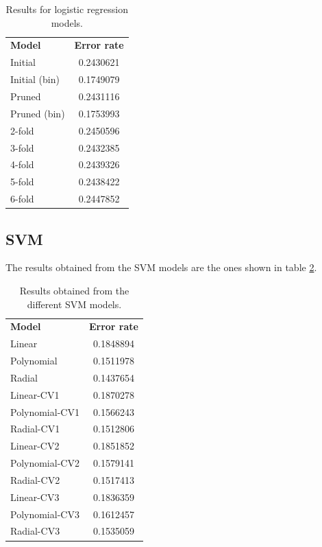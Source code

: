 \documentclass[english]{scrartcl}
\begin{document}
    \begin{table}[h]
    \centering
    \begin{tabular}{l c}
    \textbf{Model} & \textbf{Error rate} \\
    Initial & 0.2430621 \\
    Initial (bin) & 0.1749079 \\
    Pruned & 0.2431116 \\
    Pruned (bin) & 0.1753993 \\
    2-fold & 0.2450596 \\
    3-fold & 0.2432385 \\
    4-fold & 0.2439326 \\
    5-fold & 0.2438422 \\
    6-fold & 0.2447852 \\
    \end{tabular}
    \caption{Results for logistic regression models.}
    \label{table:logit-results}
    \end{table}
    
        
    \subsection{SVM}
    The results obtained from the SVM models are the ones shown in table \ref{table:svm-results}.
    
    \begin{table}[h]
    \centering
    \begin{tabular}{l c}
    \textbf{Model} & \textbf{Error rate} \\
    Linear & 0.1848894 \\
	Polynomial & 0.1511978 \\
	Radial & 0.1437654 \\
	Linear-CV1 & 0.1870278 \\
	Polynomial-CV1 & 0.1566243 \\
	Radial-CV1 & 0.1512806 \\
	Linear-CV2 & 0.1851852 \\
	Polynomial-CV2 & 0.1579141 \\
	Radial-CV2 & 0.1517413 \\
	Linear-CV3 & 0.1836359 \\
	Polynomial-CV3 & 0.1612457 \\
	Radial-CV3 & 0.1535059 \\
    \end{tabular}
    \caption{Results obtained from the different SVM models.}
    \label{table:svm-results}
    \end{table}
    
\end{document}
